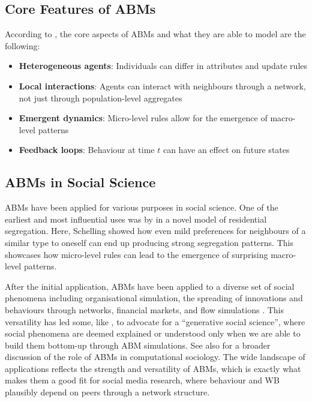 \subsection{Core Features of ABMs}

According to \textcite[Ch.~1]{RailsbackGrimm2012}, the core aspects of ABMs and what they are able to model are the following:

\begin{itemize}
    \item \textbf{Heterogeneous agents}: Individuals can differ in attributes and update rules
    \item \textbf{Local interactions}: Agents can interact with neighbours through a network, not just through population-level aggregates
    \item \textbf{Emergent dynamics}: Micro-level rules allow for the emergence of macro-level patterns
    \item \textbf{Feedback loops}: Behaviour at time $t$ can have an effect on future states
\end{itemize}

\subsection{ABMs in Social Science}

ABMs have been applied for various purposes in social science. One of the earliest and most influential uses was by \textcite{Schelling1971} in a novel model of residential segregation. Here, Schelling showed how even mild preferences for neighbours of a similar type to oneself can end up producing strong segregation patterns. This showcases how micro-level rules can lead to the emergence of surprising macro-level patterns.

After the initial application, ABMs have been applied to a diverse set of social phenomena including organisational simulation, the spreading of innovations and behaviours through networks, financial markets, and flow simulations \parencite[p.~7281]{Bonabeau2002}. This versatility has led some, like \textcite[Ch.~1]{Epstein2006}, to advocate for a ``generative social science'', where social phenomena are deemed explained or understood only when we are able to build them bottom-up through ABM simulations. See also \textcite{Macy2002} for a broader discussion of the role of ABMs in computational sociology. The wide landscape of applications reflects the strength and versatility of ABMs, which is exactly what makes them a good fit for social media research, where behaviour and WB plausibly depend on peers through a network structure.


